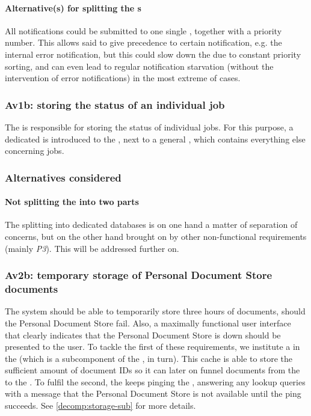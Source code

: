 \paragraph{Alternative(s) for splitting the s} All notifications could be submitted to one single , together with a priority number. This allows said  to give precedence to certain notification, e.g. the internal error notification, but this could slow down the  due to constant priority sorting, and can even lead to regular notification starvation (without the intervention of error notifications) in the most extreme of cases.

\subsubsection{Av1b: storing the status of an individual job}\label{march:av1b}
The  is responsible for storing the status of individual jobs. For this purpose, a dedicated  is introduced to the , next to a general , which contains everything else concerning jobs.

\subsubsection*{Alternatives considered}
\paragraph{Not splitting the  into two parts} The splitting into dedicated databases is on one hand a matter of separation of concerns, but on the other hand brought on by other non-functional requirements (mainly \emph{P3}). This will be addressed further on.

\subsubsection{Av2b: temporary storage of Personal Document Store documents}\label{march:av2b}
The system should be able to temporarily store three hours of documents, should the Personal Document Store fail. Also, a maximally functional user interface that clearly indicates that the Personal Document Store is down should be presented to the user. To tackle the first of these requirements, we institute a  in the  (which is a subcomponent of the , in turn). This cache is able to store the sufficient amount of document IDs so it can later on funnel documents from the  to the . To fulfil the second, the  keeps pinging the , answering any lookup queries with a message that the Personal Document Store is not available until the ping succeeds. See \ref{decomp:storage-sub} for more details.

